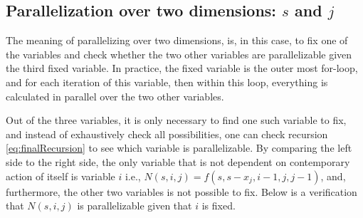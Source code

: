 \documentclass[a4paper]{article}
\begin{document}

\subsection{Parallelization over two dimensions: $s$ and $j$}
\label{sec:2Dpara}
The meaning of parallelizing over two dimensions, is, in this case, to fix one of the variables and check whether the two other variables are parallelizable given the third fixed variable. In practice, the fixed variable is the outer most for-loop, and for each iteration of this variable, then within this loop, everything is calculated in parallel over the two other variables.

Out of the three variables, it is only necessary to find one such variable to fix, and instead of exhaustively check all possibilities, one can check recursion \ref{eq:finalRecursion} to see which variable is parallelizable. By comparing the left side to the right side, the only variable that is not dependent on contemporary action of itself is variable $i$ i.e., $N(s,i,j)=f(s,s-x_{j},i-1,j,j-1)$, and, furthermore, the other two variables is not possible to fix. Below is a verification that $N(s,i,j)$ is parallelizable given that $i$ is fixed.

\end{document}
